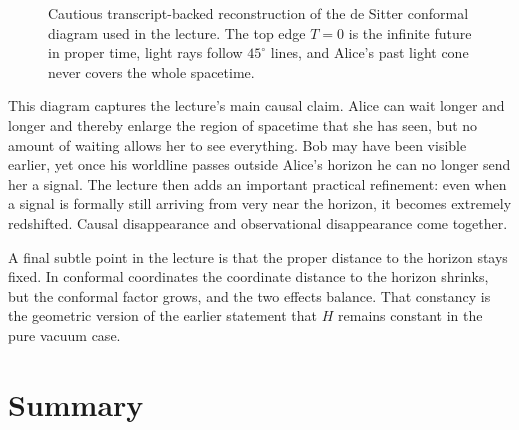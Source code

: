 \begin{figure}[htbp]
\centering
{}
\caption{Cautious transcript-backed reconstruction of the de Sitter conformal diagram used in the lecture. The top edge \(T=0\) is the infinite future in proper time, light rays follow \(45^\circ\) lines, and Alice's past light cone never covers the whole spacetime.}
\end{figure}

This diagram captures the lecture's main causal claim. Alice can wait longer and longer and thereby enlarge the region of spacetime that she has seen, but no amount of waiting allows her to see everything. Bob may have been visible earlier, yet once his worldline passes outside Alice's horizon he can no longer send her a signal. The lecture then adds an important practical refinement: even when a signal is formally still arriving from very near the horizon, it becomes extremely redshifted. Causal disappearance and observational disappearance come together.

A final subtle point in the lecture is that the proper distance to the horizon stays fixed. In conformal coordinates the coordinate distance to the horizon shrinks, but the conformal factor grows, and the two effects balance. That constancy is the geometric version of the earlier statement that \(H\) remains constant in the pure vacuum case.

\section{Summary}

